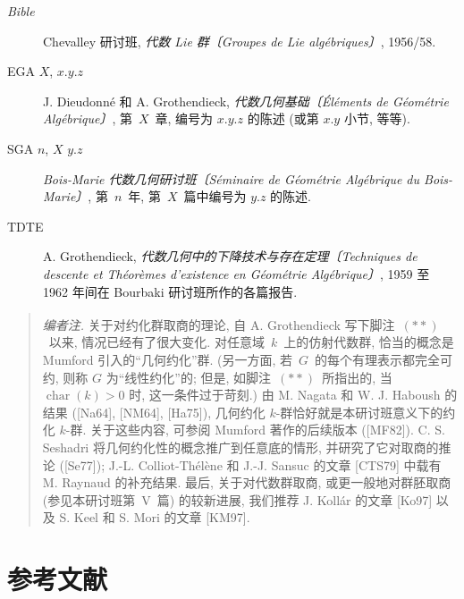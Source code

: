 \begin{description}
\item[\emph{Bible}] Chevalley 研讨班, \emph{代数 Lie 群〔Groupes de Lie alg\'ebriques〕},
  1956/58.
\item[EGA $X$, $x.y.z$] J. Dieudonn\'e 和 A. Grothendieck,
  \emph{代数几何基础〔\'El\'ements de G\'eom\'etrie Alg\'ebrique〕}, 第~$X$~章,
  编号为 $x.y.z$ 的陈述 (或第 $x.y$ 小节, 等等).
\item[SGA $n$, $X$ $y.z$] \emph{Bois-Marie 代数几何研讨班〔S\'eminaire de G\'eom\'etrie Alg\'ebrique du
  Bois-Marie〕}, 第~$n$~年, 第~$X$~篇中编号为 $y.z$ 的陈述.
\item[TDTE] A. Grothendieck, \emph{代数几何中的下降技术与存在定理〔Techniques de descente et Th\'eor\`emes
  d'existence en G\'eom\'etrie Alg\'ebrique〕}, 1959 至 1962 年间在 Bourbaki
  研讨班所作的各篇报告.
\end{description}

\begin{quote}\small
\noindent\textsuperscript{}\emph{编者注.}
关于对约化群取商的理论, 自 A. Grothendieck 写下脚注~$(\ast\ast)$~以来,
情况已经有了很大变化. 对任意域~$k$~上的仿射代数群, 恰当的概念是 Mumford
引入的“几何约化”群. (另一方面, 若~$G$~的每个有理表示都完全可约,
则称 $G$ 为“线性约化”的; 但是, 如脚注~$(\ast\ast)$~所指出的,
当 $\operatorname{char}(k)>0$ 时, 这一条件过于苛刻.)
由 M. Nagata 和 W. J. Haboush 的结果 ([Na64], [NM64], [Ha75]),
几何约化 $k$-群恰好就是本研讨班意义下的约化 $k$-群.
关于这些内容, 可参阅 Mumford 著作的后续版本 ([MF82]).
C. S. Seshadri 将几何约化性的概念推广到任意底的情形, 并研究了它对取商的推论
([Se77]); J.-L. Colliot-Th\'el\`ene 和 J.-J. Sansuc 的文章 [CTS79]
中载有 M. Raynaud 的补充结果. 最后, 关于对代数群取商, 或更一般地对群胚取商
(参见本研讨班第~V~篇) 的较新进展, 我们推荐 J. Koll\'ar 的文章 [Ko97]
以及 S. Keel 和 S. Mori 的文章 [KM97].
\end{quote}

\section*{参考文献}

